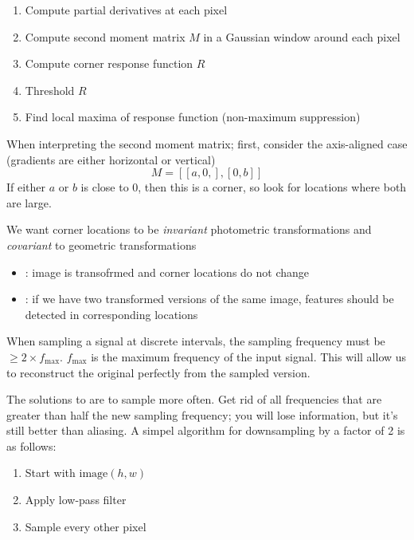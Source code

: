 \documentclass{article}
\begin{document}
\begin{definition}
  \begin{enumerate}
    \item Compute partial derivatives at each pixel 
    \item Compute second moment matrix $M$ in a Gaussian window around each pixel 
    \item Compute corner response function $R$ 
    \item Threshold $R$ 
    \item Find local maxima of response function (non-maximum suppression)
  \end{enumerate}
\end{definition}

When interpreting the second moment matrix; first, consider the axis-aligned case (gradients are either horizontal or vertical) $$M = [[a,0,],[0,b]]$$ If either $a$ or $b$ is close to 0, then this is  a corner, so look for locations where both are large. 

We want corner locations to be \emph{invariant} photometric transformations and \emph{covariant} to geometric transformations 
\begin{itemize}
  \item {}: image is transofrmed and corner locations do not change 
  \item {}: if we have two transformed versions of the same image, features should be detected in corresponding locations
\end{itemize}

\begin{theorem}
  When sampling a signal at discrete intervals, the sampling frequency must be $\geq 2 \times f_{\textrm{max}}$. $f_{\textrm{max}}$ is the maximum frequency of the input signal. This will allow us to reconstruct the original perfectly from the sampled version. 
\end{theorem}

The solutions to  are to sample more often. Get rid of all frequencies that are greater than half the new sampling frequency; you will lose information, but it's still better than aliasing. A simpel algorithm for downsampling by a factor of 2 is as follows:
\begin{enumerate}
  \item Start with $\textrm{image}(h,w)$ 
  \item Apply low-pass filter
  \item Sample every other pixel
\end{enumerate}
\end{document}
